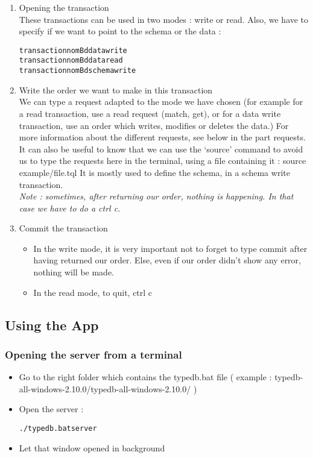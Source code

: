 \documentclass[runningheads]{llncs}
\begin{document}
\begin{enumerate}
\item Opening  the transaction\\
These transactions can be used in two modes : write or read. Also, we have to specify if we want to point to the schema or the data :

\begin{alltt}
transaction nomBd data write
transaction nomBd data read
transaction nomBd schema write
\end{alltt}       

\item Write the order we want to make in this transaction\\
We can type a request adapted to the mode we have chosen (for example for a read transaction, use a read request (match, get), or for a data write transaction, use an order which writes, modifies or deletes the data.) For more information about the different requests, see below in the part requests.\\

It can also be useful to know that we can use the ‘source’ command to avoid us to type the requests here in the terminal, using a file containing it : 
        source example/file.tql
It is mostly used to define the schema, in a schema write transaction.\\

\emph{Note : sometimes, after returning our order, nothing is happening. In that case we have to do a ctrl c.}\\

\item Commit the transaction
\begin{itemize}
\item In the write mode, it is very important not to forget to type commit after having returned our order. Else, even if our order didn’t show any error, nothing will be made.
\item In the read mode, to quit, ctrl c
\end{itemize}

\end{enumerate}


\subsection{Using the App}

\subsubsection{Opening the server from a terminal}
\begin{itemize}
\item Go to the right folder which contains the typedb.bat file ( example : typedb-all-windows-2.10.0/typedb-all-windows-2.10.0/ )
\item Open the server : \begin{alltt}./typedb.bat server \end{alltt}
\item Let that window opened in background
\end{itemize}
\end{document}
